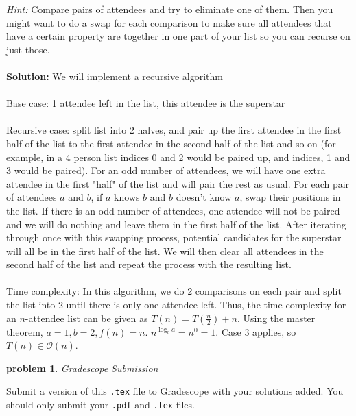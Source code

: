 \documentclass[10pt]{article}
\newtheorem{problem}{\sc\color{cit}problem}
\begin{document}
\emph{Hint:} Compare pairs of attendees and try to eliminate one of them. Then you might  want to do a swap for each comparison to make sure all attendees that have a certain property are together in one part of your list so you can recurse on just those. \\ \\
\textbf{Solution:}
We will implement a recursive algorithm \\ \\
Base case: 1 attendee left in the list, this attendee is the superstar \\ \\
Recursive case: split list into 2 halves, and pair up the first attendee in the first half of the list to the first attendee in the second half of the list and so on (for example, in a 4 person list indices 0 and 2 would be paired up, and indices, 1 and 3 would be paired). For an odd number of attendees, we will have one extra attendee in the first "half" of the list and will pair the rest as usual. For each pair of attendees $a$ and $b$, if $a$ knows $b$ and $b$ doesn't know $a$, swap their positions in the list. If there is an odd number of attendees, one attendee will not be paired and we will do nothing and leave them in the first half of the list. After iterating through once with this swapping process, potential candidates for the superstar will all be in the first half of the list. We will then clear all attendees in the second half of the list and repeat the process with the resulting list. \\ \\
Time complexity: In this algorithm, we do 2 comparisons on each pair and split the list into 2 until there is only one attendee left. Thus, the time complexity for an $n$-attendee list can be given as $T(n) = T\left(\frac{n}{2}\right) + n$. Using the master theorem, $a = 1, b = 2, f(n) = n$. $n^{\log_b{a}} = n^{0} = 1$. Case 3 applies, so $T(n) \in \mathcal{O}(n)$.
\begin{problem} Gradescope Submission \end{problem}
Submit a version of this \verb|.tex| file to Gradescope with your solutions added.  You should only submit your \verb|.pdf| and \verb|.tex| files.

%
%
\end{document}
